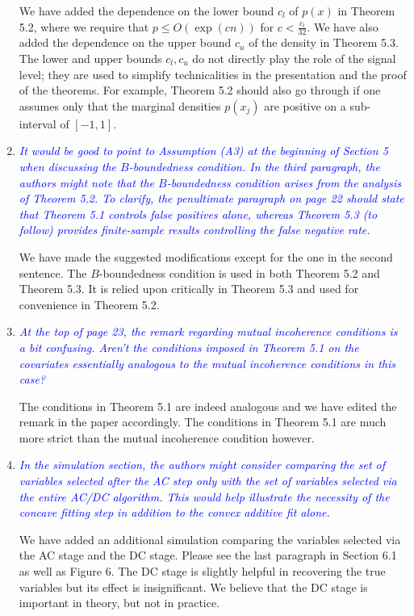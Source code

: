\documentclass[pdftex,12pt]{article}
\def\rc#1{{\it\textcolor{blue}{#1}}\smallskip}
\begin{document}
\begin{enumerate}[(1)]
We have added the dependence on the lower bound $c_l$ of $p(x)$ in
Theorem 5.2, where we require that $p \leq O(\exp(cn))$ for $c <
\frac{c_l}{32}$. We have also added the dependence on the upper bound
$c_u$ of the density in Theorem 5.3. The lower and upper bounds $c_l,
c_u$ do not directly play the role of the signal level; they are used
to simplify technicalities in the presentation and the proof of the
theorems. For example, Theorem 5.2 should also go through if one
assumes only that the marginal densities $p(x_j)$ are positive on a
sub-interval of $[-1,1]$.

\item \rc{It would be good to point to Assumption (A3) at the beginning of
Section 5 when discussing the $B$-boundedness condition. In the third
paragraph, the authors might note that the $B$-boundedness condition
arises from the analysis of Theorem 5.2. To clarify, the penultimate
paragraph on page 22 should state that Theorem 5.1 controls false
positives alone, whereas Theorem 5.3 (to follow) provides
finite-sample results controlling the false negative rate.}

We have made the suggested modifications except for the one in the second sentence. The $B$-boundedness condition is used in both Theorem 5.2 and Theorem 5.3. It is relied upon critically in Theorem 5.3 and used for convenience in Theorem 5.2. 


\item \rc{At the top
of page 23, the remark regarding mutual incoherence conditions is a
bit confusing. Aren’t the conditions imposed in Theorem 5.1 on the
covariates essentially analogous to the mutual incoherence conditions
in this case? }

The conditions in Theorem 5.1 are indeed analogous and we have edited the remark in the paper accordingly. The conditions in Theorem 5.1 are much more strict than the mutual incoherence condition however. 

\item \rc{In the simulation section, the authors might consider comparing the
set of variables selected after the AC step only with the set of
variables selected via the entire AC/DC algorithm. This would help
illustrate the necessity of the concave fitting step in addition to
the convex additive fit alone.}

We have added an additional simulation comparing the variables
selected via the AC stage and the DC stage. Please see the last
paragraph in Section 6.1 as well as Figure 6. The DC stage is slightly
helpful in recovering the true variables but its effect is
insignificant. We believe that the DC stage is important in theory, but
not in practice.


\end{enumerate}
\end{document}
